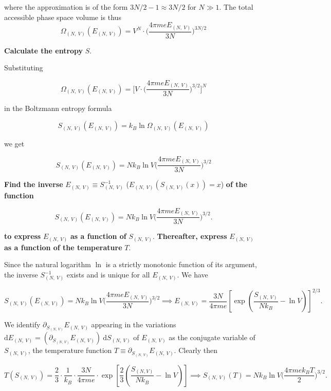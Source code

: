 \documentclass[11pt]{article}
\begin{document}
where the approximation is of the form \(3N/2 - 1 \approx 3N/2\) for \(N \gg 1\). The total accessible phase space volume is thus
\[
\boxed{
\Omega_{(N,~V)}(E_{(N,~V)}) = V^{N} \cdot \bigg(\frac{4 \pi m e E_{(N,~V)}}{3 N}\bigg)^{3N/2}
}
\]
\label{sec:orgbf1bd5a}

\textbf{Calculate the entropy} \(S\).

Substituting

\[
\Omega_{(N,~V)}(E_{(N,~V)}) = \bigg[V \cdot \bigg(\frac{4 \pi m e E_{(N,~V)}}{3 N}\bigg)^{3/2}\bigg]^{N}
\]

in the Boltzmann entropy formula

\[
S_{(N,~V)}(E_{(N,~V)})=k_{B} \ln \Omega_{(N,~V)}(E_{(N,~V)})
\]

we get

\[
\boxed{
S_{(N,~V)}(E_{(N,~V)}) = N k_{B} \ln V \bigg(\frac{4 \pi m e E_{(N,~V)}}{3 N}\bigg)^{3/2}
}
\]
\label{sec:org38f6203}

\textbf{Find the inverse} \(E_{(N,~V)} \equiv S_{(N,~V)}^{-1}\) (\(E_{(N,~V)}(S_{(N,~V)}(x)) = x\)) \textbf{of the function}

\[
S_{(N,~V)}(E_{(N,~V)}) = N k_{B} \ln V \bigg(\frac{4 \pi m e E_{(N,~V)}}{3 N}\bigg)^{3/2}.
\]

\textbf{to express} \(E_{(N,~V)}\) \textbf{as a function of} \(S_{(N,~V)}\). \textbf{Thereafter, express} \(E_{(N,~V)}\) \textbf{as a function of the temperature} \(T\).

Since the natural logarithm \(\ln\) is a strictly monotonic function of its argument, the inverse \(S_{(N,~V)}^{-1}\) exists and is unique for all \(E_{(N,~V)}\). We have

\[
S_{(N,~V)}(E_{(N,~V)}) = N k_{B} \ln V \bigg(\frac{4 \pi m e E_{(N,~V)}}{3 N}\bigg)^{3/2} \implies E_{(N,~V)}=\frac{3 N}{4 \pi m e}\left[\exp \left(\frac{S_{(N,~V)}}{N k_B}-\ln V\right)\right]^{2 / 3}.
\]

We identify \(\partial_{S_{(N,~V)}} E_{(N,~V)}\) appearing in the variations \(\mathrm{d} E_{(N,~V)} = (\partial_{S_{(N,~V)}} E_{(N,~V)})~ \mathrm{d} S_{(N,~V)}\) of \(E_{(N,~V)}\) as the conjugate variable of \(S_{(N,~V)}\), the temperature function \(T \equiv \partial_{S_{(N,~V)}} E_{(N,~V)}\). Clearly then

\[
T(S_{(N,~V)}) = \frac{2}{3} \cdot \frac{1}{k_B} \cdot \frac{3 N}{4 \pi m e} \cdot \exp \left[\frac{2}{3}\left(\frac{S_{(N, V)}}{N k_B}-\ln V\right)\right] \implies S_{(N,~V)} (T) = N k_{B} \ln V \bigg(\frac{4 \pi m e k_{B} T}{2}\bigg)^{3/2}.
\]
\end{document}
